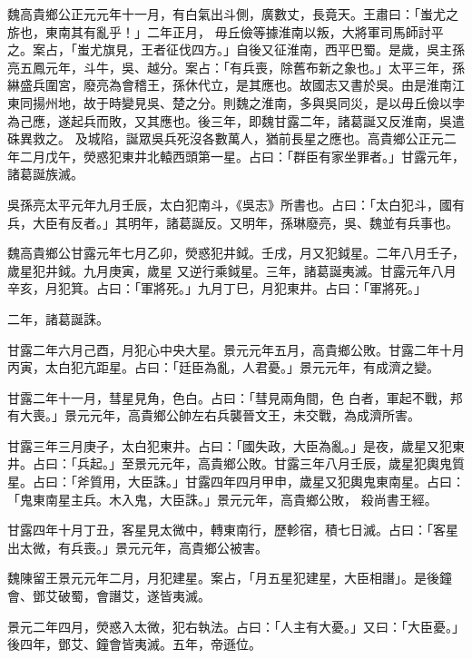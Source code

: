 \begin{pinyinscope}
 魏高貴鄉公正元元年十一月，有白氣出斗側，廣數丈，長竟天。王肅曰：「蚩尤之旂也，東南其有亂乎！」二年正月，
 毋丘儉等據淮南以叛，大將軍司馬師討平之。案占，「蚩尤旗見，王者征伐四方。」自後又征淮南，西平巴蜀。是歲，吳主孫亮五鳳元年，斗牛，吳、越分。案占：「有兵喪，除舊布新之象也。」太平三年，孫綝盛兵圍宮，廢亮為會稽王，孫休代立，是其應也。故國志又書於吳。由是淮南江東同揚州地，故于時變見吳、楚之分。則魏之淮南，多與吳同災，是以毋丘儉以孛為己應，遂起兵而敗，又其應也。後三年，即魏甘露二年，諸葛誕又反淮南，吳遣硃異救之。
 及城陷，誕眾吳兵死沒各數萬人，猶前長星之應也。高貴鄉公正元二年二月戊午，熒惑犯東井北轅西頭第一星。占曰：「群臣有家坐罪者。」甘露元年，諸葛誕族滅。



 吳孫亮太平元年九月壬辰，太白犯南斗，《吳志》所書也。占曰：「太白犯斗，國有兵，大臣有反者。」其明年，諸葛誕反。又明年，孫琳廢亮，吳、魏並有兵事也。



 魏高貴鄉公甘露元年七月乙卯，熒惑犯井鉞。壬戌，月又犯鉞星。二年八月壬子，歲星犯井鉞。九月庚寅，歲星
 又逆行乘鉞星。三年，諸葛誕夷滅。甘露元年八月辛亥，月犯箕。占曰：「軍將死。」九月丁巳，月犯東井。占曰：「軍將死。」



 二年，諸葛誕誅。



 甘露二年六月己酉，月犯心中央大星。景元元年五月，高貴鄉公敗。甘露二年十月丙寅，太白犯亢距星。占曰：「廷臣為亂，人君憂。」景元元年，有成濟之變。



 甘露二年十一月，彗星見角，色白。占曰：「彗見兩角間，色
 白者，軍起不戰，邦有大喪。」景元元年，高貴鄉公帥左右兵襲晉文王，未交戰，為成濟所害。



 甘露三年三月庚子，太白犯東井。占曰：「國失政，大臣為亂。」是夜，歲星又犯東井。占曰：「兵起。」至景元元年，高貴鄉公敗。甘露三年八月壬辰，歲星犯輿鬼質星。占曰：「斧質用，大臣誅。」甘露四年四月甲申，歲星又犯輿鬼東南星。占曰：「鬼東南星主兵。木入鬼，大臣誅。」景元元年，高貴鄉公敗，
 殺尚書王經。



 甘露四年十月丁丑，客星見太微中，轉東南行，歷軫宿，積七日滅。占曰：「客星出太微，有兵喪。」景元元年，高貴鄉公被害。



 魏陳留王景元元年二月，月犯建星。案占，「月五星犯建星，大臣相譖」。是後鐘會、鄧艾破蜀，會譖艾，遂皆夷滅。



 景元二年四月，熒惑入太微，犯右執法。占曰：「人主有大憂。」又曰：「大臣憂。」後四年，鄧艾、鐘會皆夷滅。五年，帝遜位。




\end{pinyinscope}
